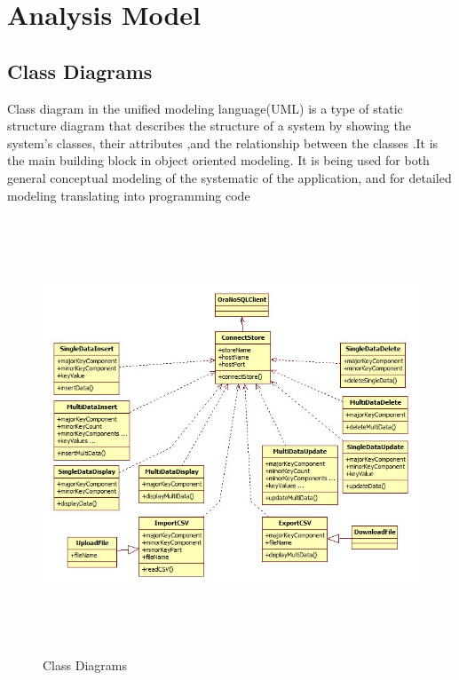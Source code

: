 \section{Analysis Model}
\subsection{Class Diagrams}
\hspace*{0.7in} Class diagram in the unified modeling language(UML) is a type of static structure  diagram that describes the structure of a system by showing the system's classes, their attributes ,and the relationship between the classes .It is the main building block in object oriented modeling. It is being used for both general conceptual modeling of the systematic of the application, and for detailed modeling translating into programming code \\
\begin{figure}[h]
\centering
  \includegraphics[width=17cm,height=13cm]{Fig9.jpg}
  \caption{Class Diagrams}\label{Class Diagrams}
\end{figure}

\newpage
